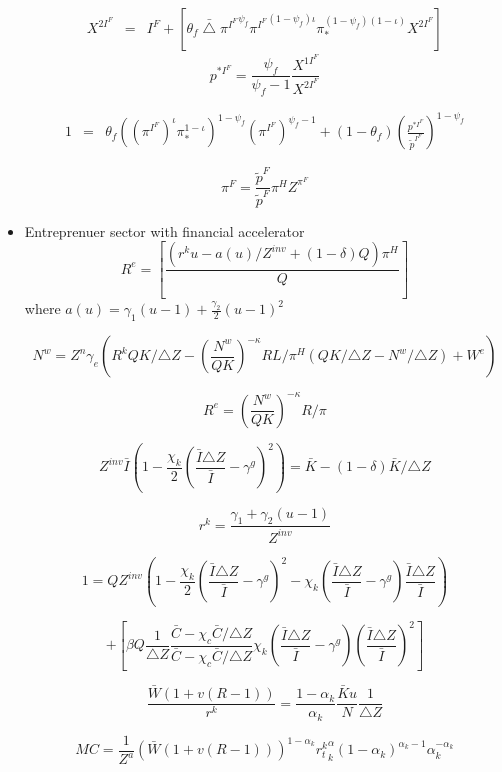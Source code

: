 \documentclass[11pt, a4paper]{article}
\begin{document}
\begin{itemize}
\begin{eqnarray*} X^{2I^F} &=&  I^F + \left[\theta_f \bar{\bigtriangleup}  {\pi^{I^F}}^{\psi_f} {\pi^{I^F}}^{(1-\psi_f)\iota} \pi_*^{(1-\psi_f)(1-\iota) } X^{2I^F} \right]
\end{eqnarray*} 
\[p^{*I^F} = \frac{\psi_f}{\psi_f-1} \frac{X^{1I^F}}{X^{2I^F}} \]

\begin{eqnarray*}
1 &=&  {\theta_f} {\left({(\pi^{I^F})}^{\iota} \pi_*^{1-\iota}\right)}^{1-\psi_f} {(\pi^{I^F})}^{\psi_f-1}  + (1-\theta_f)  \left({\frac{p^{*I^F}} {\tilde{p}^{I^F}}}\right)^{1-\psi_f}
\end{eqnarray*} 

\[ \pi^F = \frac{\tilde{p}^{F}} {\tilde{p}^{F}} \pi^H Z^{\pi^F}\]

\item Entreprenuer sector with financial accelerator
\[ R^e =  \left[\frac{(r^k u - a(u)/Z^{inv}+ (1-\delta)Q)\pi^H}{Q} \right]\]
  where $a(u)= \gamma_1(u -1) + \frac{\gamma_2}{2}(u -1)^2$
  
    \[ N^w = Z^n \gamma_e\left(R^k Q K/ {\bigtriangleup Z}   - \left(\frac{N^w}{Q K} \right)^{-\kappa} R L /\pi^H (QK/{\bigtriangleup Z} - N^w/{\bigtriangleup Z})+ W^e \right)  \]  
    
    \[R^e =\left(\frac{N^w}{Q K} \right)^{-\kappa} R/\pi \]
    
    \[Z^{inv} \bar{I} \left(1-\frac{\chi_k}{2} \left(\frac{\bar{I} {\bigtriangleup Z}}{\bar{I}} -\gamma^g \right)^2  \right )= \bar{K} -(1-\delta) \bar{K}/{\bigtriangleup Z} \]
    
    \[r^k = \frac{\gamma_1 + \gamma_2(u -1)}{Z^{inv}}\]
    
    \[1 = Q Z^{inv}\left(1-\frac{\chi_k}{2} \left(\frac{\bar{I} {\bigtriangleup Z}}{\bar{I}} -\gamma^g\right)^2 -\chi_k\left(\frac{\bar{I} {\bigtriangleup Z}}{\bar{I} } - \gamma^g  \right)\frac{\bar{I} {\bigtriangleup Z}}{\bar{I} }  \right)\]
    
    \[  + \left[ \beta Q\frac{1}{\bigtriangleup Z}\frac{\bar{C}-\chi_c \bar{C}/{\bigtriangleup Z}}{\bar{C}-\chi_c \bar{C}/{\bigtriangleup Z}}\chi_k \left(\frac{\bar{I} {\bigtriangleup Z}}{\bar{I} } - \gamma^g  \right) \left(\frac{\bar{I} {\bigtriangleup Z}}{\bar{I} } \right)^2 \right]\]

\[\frac{\bar{W} (1+v(R -1))}{r^k} = \frac{1-\alpha_k}{\alpha_k} \frac{\bar{K} u}{N } \frac{1}{{\bigtriangleup Z}}\]


\[ MC = \frac{1}{Z^a}\left(\bar{W}(1+v(R-1))  \right)^{1-\alpha_k} {r_t^k}^\alpha_k(1-\alpha_k)^{\alpha_k -1}\alpha_k ^{-\alpha_k}\]


\end{itemize}
\end{document}
